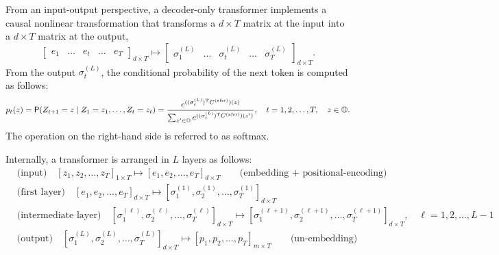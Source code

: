 \documentclass[twoside,11pt]{article}
\def\bO{\mathbb{O}}
\def\sP{{\sf P}}
\def\tp{{\hbox{\rm\tiny T}}}
\def\xfer{{\text{\rm (xfer)}}}
\begin{document}
From an input-output perspective, a decoder-only transformer implements a causal nonlinear
transformation that transforms a $d\times T$ matrix at the
input into a $d\times T$ matrix at the output,
\begin{equation*}
\begin{bmatrix} e_1 & \hdots & e_t & \hdots & e_T \end{bmatrix}_{d\times T} \mapsto \begin{bmatrix} \sigma_1^{(L)} & \hdots & \sigma_t^{(L)} & \hdots & \sigma_T^{(L)} \end{bmatrix}_{d\times T}.
\end{equation*}
From the output $\sigma_t^{(L)}$, the conditional probability of the
next token is computed as follows: 
\begin{equation*}
p_{t}(z)=\sP(Z_{t+1}=z \mid Z_1=z_1,\hdots,Z_t=z_t) = \frac{e^{((\sigma_t^{(L)})^\tp
    C^\xfer)(z)}}{\sum_{z'\in\bO} e^{((\sigma_t^{(L)})^\tp C^\xfer)(z')}},\quad
t=1,2,\hdots,T,\quad z\in\bO.
\end{equation*}
The operation on the right-hand side is referred to as softmax.

Internally, a transformer is arranged in $L$ layers as follows:
\begin{align*}
&\text{(input)} \quad [z_1,z_2,\hdots,z_T]_{1\times T} \mapsto
                 [e_1,e_2,\hdots,e_T]_{d\times T} \qquad
                 \text{(embedding + positional-encoding)}\\[5pt]
&\text{(first layer)} \quad  [e_1,e_2,\hdots,e_T]_{d\times T} \mapsto [\sigma_1^{(1)},\sigma_2^{(1)},\hdots,\sigma_T^{(1)}]_{d\times T}\\[5pt]
  &\text{(intermediate layer)} \quad  [\sigma_1^{(\ell)},\sigma_2^{(\ell)},\hdots,\sigma_T^{(\ell)}]_{d\times T}  \mapsto  [\sigma_1^{(\ell+1)},\sigma_2^{(\ell+1)},\hdots,\sigma_T^{(\ell+1)}]_{d\times T},\quad \ell=1,2,\hdots,L-1\\[5pt]
  &\text{(output)} \quad
    [\sigma_1^{(L)},\sigma_2^{(L)},\hdots,\sigma_T^{(L)}]_{d\times
    T} \mapsto [p_1,p_2,\hdots,p_T]_{m\times T} \qquad \text{(un-embedding)}
\end{align*}
\end{document}

